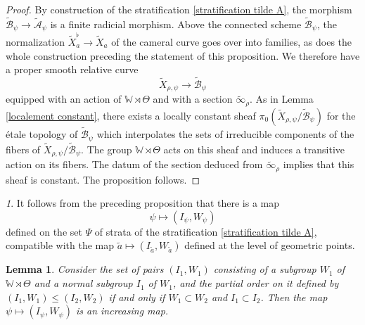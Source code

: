 \documentclass[12pt,english]{smfart}
\numberwithin{equation}{subsection}
\newtheorem{lemma}[equation]{Lemma}
\theoremstyle{remark}
\newtheorem{numero}[equation]{}
\begin{document}
\begin{proof}
By construction of the stratification \ref{stratification tilde A}, the morphism $\tilde{\mathcal{B}}_\psi\rightarrow\tilde{\mathcal{A}}_\psi$ is a finite radicial morphism. Above the connected scheme $\tilde{\mathcal{B}}_\psi$, the normalization $\widetilde X_a^\flat\rightarrow\widetilde X_a$ of the cameral curve goes over into families, as does the whole construction preceding the statement of this proposition. We therefore have a proper smooth relative curve
$$\widetilde X_{\rho,\psi}\rightarrow\tilde{\mathcal{B}}_\psi$$
equipped with an action of $\mathbb{W}\rtimes\Theta$ and with a section $\tilde\infty_\rho$. As in Lemma \ref{localement constant}, there exists a locally constant sheaf $\pi_0(\widetilde X_{\rho,\psi}/\tilde{\mathcal{B}}_\psi)$ for the \'etale topology of $\tilde{\mathcal{B}}_\psi$ which interpolates the sets of irreducible components of the fibers of $\widetilde X_{\rho,\psi}/\tilde{\mathcal{B}}_\psi$. The group $\mathbb{W}\rtimes\Theta$ acts on this sheaf and induces a transitive action on its fibers. The datum of the section deduced from $\tilde\infty_\rho$ implies that this sheaf is constant. The proposition follows.
\end{proof}

\begin{numero}\label{stratification tilde A I W}
It follows from the preceding proposition that there is a map
$$\psi\mapsto (I_\psi,W_\psi)$$
defined on the set $\Psi$ of strata of the stratification \ref{stratification tilde A}, compatible with the map $\tilde a\mapsto (I_{\tilde a},W_{\tilde a})$ defined at the level of geometric points.
\end{numero}

\begin{lemma}\label{I W croissant}
Consider the set of pairs $(I_1,W_1)$ consisting of a subgroup $W_1$ of $\mathbb{W}\rtimes\Theta$ and a normal subgroup $I_1$ of $W_1$, and the partial order on it defined by $(I_1,W_1)\leq (I_2,W_2)$ if and only if $W_1\subset W_2$ and $I_1\subset I_2$. Then the map $\psi\mapsto (I_\psi,W_\psi)$ is an increasing map.
\end{lemma}
\end{document}
